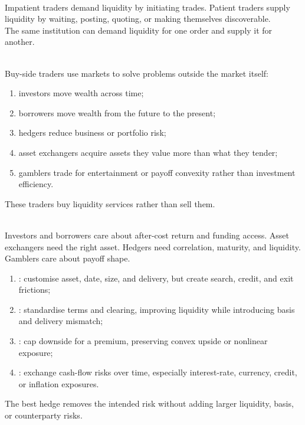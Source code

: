 \begin{principle} \\
Impatient traders demand liquidity by initiating trades. Patient traders supply liquidity by waiting, posting, quoting, or making themselves discoverable.\\
The same institution can demand liquidity for one order and supply it for another.
\end{principle}

\begin{taxonomy} \\
Buy-side traders use markets to solve problems outside the market itself:
\begin{enumerate}[label=\roman*.]
\setlength{\itemsep}{0pt}
\item investors move wealth across time;
\item borrowers move wealth from the future to the present;
\item hedgers reduce business or portfolio risk;
\item asset exchangers acquire assets they value more than what they tender;
\item gamblers trade for entertainment or payoff convexity rather than investment efficiency.
\end{enumerate}
These traders buy liquidity services rather than sell them.
\end{taxonomy}

\begin{principle} \\
Investors and borrowers care about after-cost return and funding access. Asset exchangers need the right asset. Hedgers need correlation, maturity, and liquidity. Gamblers care about payoff shape.
\end{principle}

\begin{taxonomy} 
\begin{enumerate}[label=\roman*.]
\setlength{\itemsep}{0pt}
\item {}: customise asset, date, size, and delivery, but create search, credit, and exit frictions;
\item {}: standardise terms and clearing, improving liquidity while introducing basis and delivery mismatch;
\item {}: cap downside for a premium, preserving convex upside or nonlinear exposure;
\item {}: exchange cash-flow risks over time, especially interest-rate, currency, credit, or inflation exposures.
\end{enumerate}
The best hedge removes the intended risk without adding larger liquidity, basis, or counterparty risks.
\end{taxonomy}

